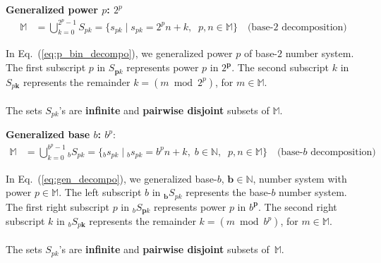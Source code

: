\documentclass[12pt]{article}
\theoremstyle{definition} %
\numberwithin{equation}{section}
\newcommand{\eqrefc}[1]{Eq.~(\ref{eq:#1})}
\begin{document}
\vspace{1em}
\textbf{Generalized power \(p\): \(2^{p}\)}
\begin{align}
\mathbb{M} & = \bigcup_{k=0}^{2^p-1}S_{pk} = \{ s_{pk} \mid s_{pk} = 2^pn+k,\;\;p, n \in \mathbb{M}\}\quad\text{(base-2 decomposition)} \label{eq:p_bin_decompo}
\end{align}

In \eqrefc{p_bin_decompo}, we generalized power \(p\) of base-\(2\) number system. The first subscript \(p\) 
in \(S_{\bm{p}k} \) represents power
\(p\) in \(2^{\bm{p}}\). The second subscript \(k\) in \(S_{p\bm{k}} \) represents the remainder \(k = (m \bmod 2^p)\), for \(m \in \mathbb{M}\). \\
\\
The sets \(S_{pk}\)'s are \textbf{infinite} and \textbf{pairwise disjoint} subsets of \(\mathbb{M}\).

\vspace{1em}
\textbf{Generalized base \(b\): \(b^{p}\)}:
\begin{align}
\mathbb{M} & = \bigcup_{k=0}^{b^p-1} {}_b\!S_{pk} = \{ {}_b\!s_{pk} \mid {}_b\!s_{pk} = b^pn+k,\;b\in \mathbb{N},\;\;p,n \in \mathbb{M}\}\quad\text{(base-\(b\) decomposition)} \label{eq:gen_decompo}
\end{align}

In \eqrefc{gen_decompo}, we generalized base-\(b\), \(\bm{b} \in \mathbb{N}\), number system with power \(p \in \mathbb{M}\). The left subscript \(b\) in \({}_{\bm{b}}\!S_{pk} \) represents the base-\(b\) number system.  The first right subscript \(p\) 
in \({}_{b}\!S_{\bm{p}k} \) represents power
\(p\) in \(b^{\bm{p}}\). The second right subscript \(k\) in \({}_{b}\!S_{p\bm{k}} \) represents the remainder \(k = (m \bmod b^p)\), for \(m \in \mathbb{M}\).\\
\\
The sets \(S_{pk}\)'s are \textbf{infinite} and \textbf{pairwise disjoint} subsets of~\(\mathbb{M}\).
\end{document}

